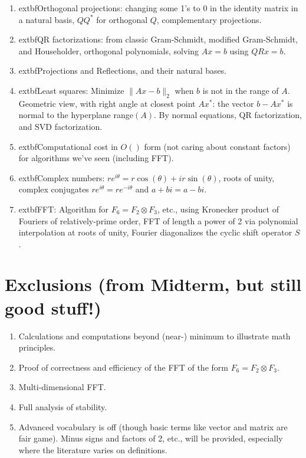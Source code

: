 \documentclass[lang=cn,11pt]{elegantbook}
\begin{document}
\begin{enumerate}
    \item 	extbf{Orthogonal projections}: changing some 1’s to 0 in the identity matrix in a natural basis, $QQ^*$ for orthogonal $Q$, complementary projections.
    
    \item 	extbf{QR factorizations}: from classic Gram-Schmidt, modified Gram-Schmidt, and Householder, orthogonal polynomials, solving $Ax = b$ using $QRx = b$.
    
    \item 	extbf{Projections and Reflections}, and their natural bases.
    
    \item 	extbf{Least squares}: Minimize $\|Ax - b\|_2$ when $b$ is not in the range of $A$. Geometric view, with right angle at closest point $Ax^*$: the vector $b - Ax^*$ is normal to the hyperplane range$(A)$. By normal equations, QR factorization, and SVD factorization.
    
    \item 	extbf{Computational cost in $O()$ form} (not caring about constant factors) for algorithms we’ve seen (including FFT).
    
    \item 	extbf{Complex numbers}: $re^{i\theta} = r\cos(\theta) + ir\sin(\theta)$, roots of unity, complex conjugates $re^{i\theta} = re^{-i\theta}$ and $a + bi = a - bi$.
    
    \item 	extbf{FFT}: Algorithm for $F_6 = F_2 \otimes F_3$, etc., using Kronecker product of Fouriers of relatively-prime order, FFT of length a power of 2 via polynomial interpolation at roots of unity, Fourier diagonalizes the cyclic shift operator $S$.
\end{enumerate}

\section{Exclusions (from Midterm, but still good stuff!)}

\begin{enumerate}
    \item Calculations and computations beyond (near-) minimum to illustrate math principles.
    \item Proof of correctness and efficiency of the FFT of the form $F_6 = F_2 \otimes F_3$.
    \item Multi-dimensional FFT.
    \item Full analysis of stability.
    \item Advanced vocabulary is off (though basic terms like vector and matrix are fair game). Minus signs and factors of 2, etc., will be provided, especially where the literature varies on definitions.
\end{enumerate}
\end{document}
